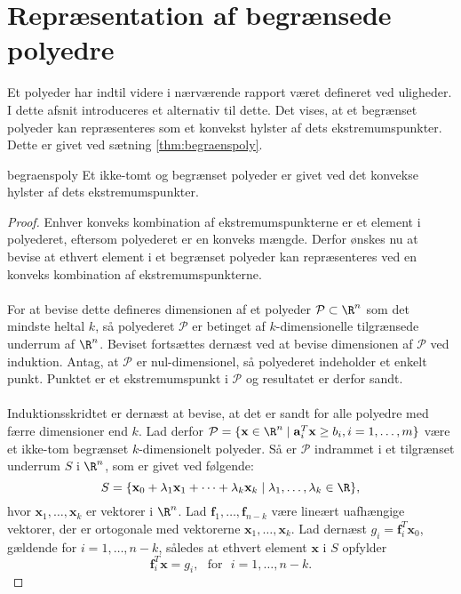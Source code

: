 \section{Repræsentation af begrænsede polyedre}
%
Et polyeder har indtil videre i nærværende rapport været defineret ved uligheder. 
I dette afsnit introduceres et alternativ til dette. 
Det vises, at et begrænset polyeder kan repræsenteres som et konvekst hylster af dets ekstremumspunkter. 
Dette er givet ved sætning \ref{thm:begraenspoly}. 
\begin{thm}{}{begraenspoly}
Et ikke-tomt og begrænset polyeder er givet ved det konvekse hylster af dets ekstremumspunkter.
\end{thm}
%
\begin{proof}
Enhver konveks kombination af ekstremumspunkterne er et element i polyederet, eftersom polyederet er en konveks mængde. 
Derfor ønskes nu at bevise at ethvert element i et begrænset polyeder kan repræsenteres ved en konveks kombination af ekstremumspunkterne. 
\\\\
For at bevise dette defineres dimensionen af et polyeder $\mathcal{P} \subset \R^n$ som det mindste heltal $k$, så polyederet $\mathcal{P}$ er betinget af $k$-dimensionelle tilgrænsede underrum af $\R^n$. 
Beviset fortsættes dernæst ved at bevise dimensionen af $\mathcal{P}$ ved induktion. 
Antag, at $\mathcal{P}$ er nul-dimensionel, så polyederet indeholder et enkelt punkt. 
Punktet er et ekstremumspunkt i $\mathcal{P}$ og resultatet er derfor sandt. \\\\
Induktionsskridtet er dernæst at bevise, at det er sandt for alle polyedre med færre dimensioner end $k$. Lad derfor $\mathcal{P} = \{\textbf{x} \in \R^n \mid \mathbf{a}_{i}^T \textbf{x} \geq b_i, i=1,\ldots,m\}$ være et ikke-tom begrænset $k$-dimensionelt polyeder. 
Så er $\mathcal{P}$ indrammet i et tilgrænset underrum $S$ i $\R^n$, som er givet ved følgende: \\
$$S = \{\textbf{x}_0+\lambda_1 \textbf{x}_1+\cdots+\lambda_k\textbf{x}_k \mid \lambda_1,\ldots,\lambda_k \in \R\},$$
hvor $\textbf{x}_1,\ldots,\textbf{x}_k$ er vektorer i $\R^n$. 
Lad $\textbf{f}_1,\ldots,\textbf{f}_{n-k}$ være lineært uafhængige vektorer, der er ortogonale med vektorerne $\textbf{x}_1,\ldots,\textbf{x}_k$. 
Lad dernæst $g_i=\mathbf{f}_{i}^T \textbf{x}_0$, gældende for $i=1,\ldots,n-k$, således at ethvert element $\textbf{x}$ i $S$ opfylder 
$$\mathbf{f}_{i}^T \textbf{x}=g_i, \text{     } \text{for} \text{     } i=1,\ldots,n-k.$$ 

\end{proof}
